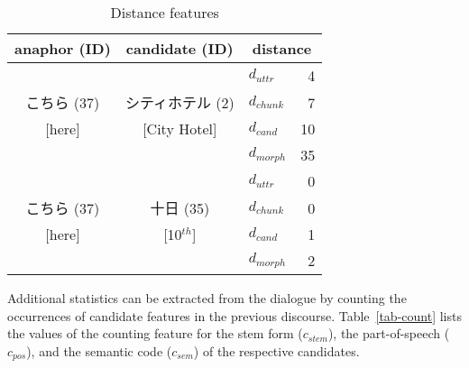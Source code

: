 \setlength{\tabcolsep}{10pt}
\begin{table}[hbt]
   \vspace*{-0.5\baselineskip}
   \begin{center}
   \begin{footnotesize}
    \caption{Distance features}\label{tab-dist} 
    \vspace*{0.5em}
    \begin{tabular}{|ccl@{=}r|}
      \hline
      anaphor (ID) & candidate (ID) & \multicolumn{2}{c|}{distance} \\
      \hline \hline
                  &                  & $d_{uttr}$   &  4  \\
      こちら (37) & シティホテル (2) & $d_{chunk}$  &  7  \\
      $[$here]    &  [City Hotel]    & $d_{cand}$   &  10  \\
                  &                  & $d_{morph}$  &  35 \\
      \hline
                  &                  & $d_{uttr}$   &  0  \\
      こちら (37) & 十日 (35)        & $d_{chunk}$  &  0  \\
      $[$here]    & [10${}^{th}$]      & $d_{cand}$   &  1  \\
                  &                  & $d_{morph}$  &  2  \\
      \hline
     \end{tabular}
   \end{footnotesize}
   \end{center}
   \vspace*{-1\baselineskip}
\end{table}

Additional statistics can be extracted from the dialogue by counting the occurrences of candidate features
in the previous discourse. Table~\ref{tab-count} lists the values of the counting feature for
the stem form ($c_{stem}$), the part-of-speech ($c_{pos}$), and
the semantic code ($c_{sem}$) of the respective candidates.

\vspace*{8mm}

